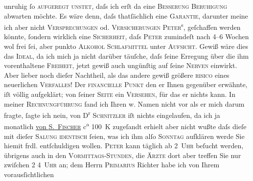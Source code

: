 \begin{ledgroupsized}[t]{13cm}
               unruhig ſo \textsc{aufgeregt}{ }{\kaufmannsund}{ }\textsc{unstet}, daſs ich erſt da eine \textsc{Beſſerung}{ }{\kaufmannsund}{ }\textsc{Beruhigung} abwarten möchte.\pend
           \pstart
           Es wäre denn, daſs thatſächlich eine \textsc{Garantie}, darunter
               meine ich aber nicht \textsc{Versprechungen} od. \textsc{Versicherungen}{ }\textsc{Peter}\textsuperscript{s}, geſchaffen werden {\pb}könnte, ſondern wirklich eine \textsc{Sicherheit}, daſs \textsc{Peter} zumindeſt nach 4–6 Wochen wol frei ſei, aber punkto \textsc{Alkohol}{ }{\kaufmannsund}{ }\textsc{Schlafmittel} unter \textsc{Aufsicht}.\pend
           \pstart
           Gewiß wäre dies das \textsc{Ideal}, da ich mich ja nicht darüber
               täuſche, daſs ſeine Erregung über die ihm vorenthaltene \textsc{Freiheit}, jetzt gewiß auch ungünſtig auf ſeine \textsc{Nerven} einwirkt.\pend
           \pstart
           Aber lieber noch dieſer {\pb}Nachtheil, als das andere {\kaufmannsund} gewiß größere \textsc{risico} eines
               neuerlichen \textsc{Verfalles}!\pend
           \pstart
           Der \textsc{financielle Punkt} den er Ihnen gegenüber erwähnte, iſt
               völlig aufgeklärt; von ſeiner \textsc{Seite} ein \textsc{Versehen}, für das er nichts kann. In meiner \textsc{Rechnungführung} fand ich Ihren w. Namen nicht vor {\kaufmannsund} als er mich darum fragte, ſagte ich nein, von D\textsuperscript{r}{ }\textsc{Schnitzler}{ }{\pb}iſt nichts eingelaufen, da ich ja monatlich \uline{von \textsc{S. Fischer}} c\textsuperscript{a} 100 K zugeſandt erhielt aber nicht wußte daſs
               dieſe mit dieſer \textsc{Sa{\geminationm}lung
                  identisch} ſeien, was ich ihm alſo \textsc{Sonntag} aufklären werde {\kaufmannsund} Sie hiemit frdl. entſchuldigen
               wollen.\pend
           \pstart
           \textsc{Peter} kann täglich ab 2 \textsc{Uhr} beſucht werden, übrigens auch
               in den \textsc{Vormittags-Stunden}, die \textsc{Ärzte} dort aber {\pb}treffen Sie nur zwiſchen 2
                  {\kaufmannsund} 4 \textsc{Uhr} an; dem Herrn \textsc{Primarius}{ }Richter habe ich von Ihrem vorausſichtlichen

\end{ledgroupsized}
